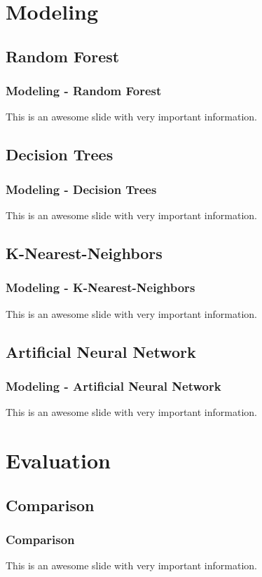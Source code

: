 \documentclass[10pt, aspectratio=169]{beamer}
\begin{document}
\section{Modeling}
\subsection{Random Forest}
\begin{frame}
    \frametitle{Modeling - Random Forest}
    \begin{outline}
        \1 This is an awesome slide with very important information. 
    \end{outline}
\end{frame}
\subsection{Decision Trees}
\begin{frame}
    \frametitle{Modeling - Decision Trees}
    \begin{outline}
        \1 This is an awesome slide with very important information. 
    \end{outline}
\end{frame}
\subsection{K-Nearest-Neighbors}
\begin{frame}
    \frametitle{Modeling - K-Nearest-Neighbors}
    \begin{outline}
        \1 This is an awesome slide with very important information. 
    \end{outline}
\end{frame}
\subsection{Artificial Neural Network}
\begin{frame}
    \frametitle{Modeling - Artificial Neural Network}
    \begin{outline}
        \1 This is an awesome slide with very important information. 
    \end{outline}   
\end{frame}
\section{Evaluation}
\subsection{Comparison}
\begin{frame}
    \frametitle{Comparison}
    \begin{outline}
        \1 This is an awesome slide with very important information. 
    \end{outline}
\end{frame}
\end{document}

